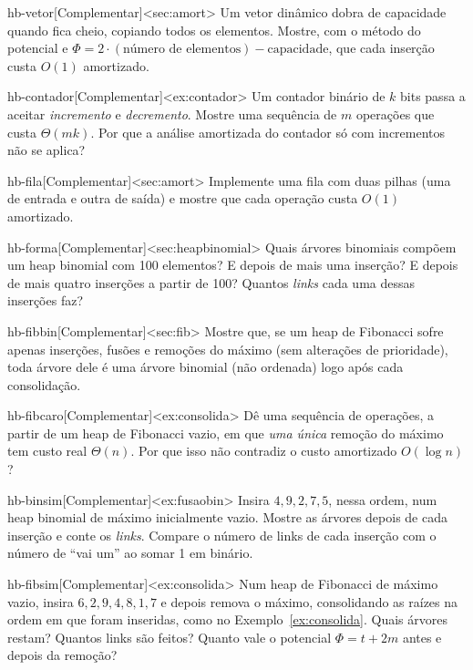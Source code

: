 \excompl
\begin{exercicio}{hb-vetor}[Complementar]<sec:amort>
Um vetor dinâmico dobra de capacidade quando fica cheio, copiando todos os elementos. Mostre, com o método do potencial e $\Phi=2\cdot(\text{número de elementos})-\text{capacidade}$, que cada inserção custa $O(1)$ amortizado.
\end{exercicio}
\begin{exercicio}{hb-contador}[Complementar]<ex:contador>
Um contador binário de $k$ bits passa a aceitar \emph{incremento} e \emph{decremento}. Mostre uma sequência de $m$ operações que custa $\Theta(mk)$. Por que a análise amortizada do contador só com incrementos não se aplica?
\end{exercicio}
\begin{exercicio}{hb-fila}[Complementar]<sec:amort>
Implemente uma fila com duas pilhas (uma de entrada e outra de saída) e mostre que cada operação custa $O(1)$ amortizado.
\end{exercicio}
\begin{exercicio}{hb-forma}[Complementar]<sec:heapbinomial>
Quais árvores binomiais compõem um heap binomial com 100 elementos? E depois de mais uma inserção? E depois de mais quatro inserções a partir de 100? Quantos \emph{links} cada uma dessas inserções faz?
\end{exercicio}
\begin{exercicio}{hb-fibbin}[Complementar]<sec:fib>
Mostre que, se um heap de Fibonacci sofre apenas inserções, fusões e remoções do máximo (sem alterações de prioridade), toda árvore dele é uma árvore binomial (não ordenada) logo após cada consolidação.
\end{exercicio}
\begin{exercicio}{hb-fibcaro}[Complementar]<ex:consolida>
Dê uma sequência de operações, a partir de um heap de Fibonacci vazio, em que \emph{uma única} remoção do máximo tem custo real $\Theta(n)$. Por que isso não contradiz o custo amortizado $O(\log n)$?
\end{exercicio}
\begin{exercicio}{hb-binsim}[Complementar]<ex:fusaobin>
Insira $4,9,2,7,5$, nessa ordem, num heap binomial de máximo inicialmente vazio. Mostre as árvores depois de cada inserção e conte os \emph{links}. Compare o número de links de cada inserção com o número de ``vai um'' ao somar 1 em binário.
\end{exercicio}
\begin{exercicio}{hb-fibsim}[Complementar]<ex:consolida>
Num heap de Fibonacci de máximo vazio, insira $6,2,9,4,8,1,7$ e depois remova o máximo, consolidando as raízes na ordem em que foram inseridas, como no Exemplo~\ref{ex:consolida}. Quais árvores restam? Quantos links são feitos? Quanto vale o potencial $\Phi=t+2m$ antes e depois da remoção?
\end{exercicio}
